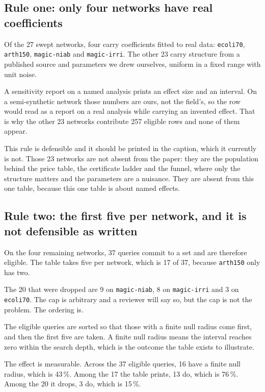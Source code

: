 \subsection{Rule one: only four networks have real coefficients}

Of the 27 swept networks, four carry coefficients fitted to real data: \texttt{ecoli70},
\texttt{arth150}, \texttt{magic-niab} and \texttt{magic-irri}. The other 23 carry structure from a
published source and parameters we drew ourselves, uniform in a fixed range with unit noise.

A sensitivity report on a named analysis prints an effect size and an interval. On a
semi-synthetic network those numbers are ours, not the field's, so the row would read as a report
on a real analysis while carrying an invented effect. That is why the other 23 networks contribute
257 eligible rows and none of them appear.

This rule is defensible and it should be printed in the caption, which it currently is not. Those
23 networks are not absent from the paper: they are the population behind the price table, the
certificate ladder and the funnel, where only the structure matters and the parameters are a
nuisance. They are absent from this one table, because this one table is about named effects.

\subsection{Rule two: the first five per network, and it is not defensible as written}

On the four remaining networks, 37 queries commit to a set and are therefore eligible. The table
takes five per network, which is 17 of 37, because \texttt{arth150} only has two.

The 20 that were dropped are 9 on \texttt{magic-niab}, 8 on \texttt{magic-irri} and 3 on
\texttt{ecoli70}. The cap is arbitrary and a reviewer will say so, but the cap is not the problem.
The ordering is.

\begin{verdict}
The eligible queries are sorted so that those with a finite null radius come first, and then the
first five are taken. A finite null radius means the interval reaches zero within the search depth,
which is the outcome the table exists to illustrate.

The effect is measurable. Across the 37 eligible queries, 16 have a finite null radius, which is
43\,\%. Among the 17 the table prints, 13 do, which is 76\,\%. Among the 20 it drops, 3 do, which
is 15\,\%.
\end{verdict}

